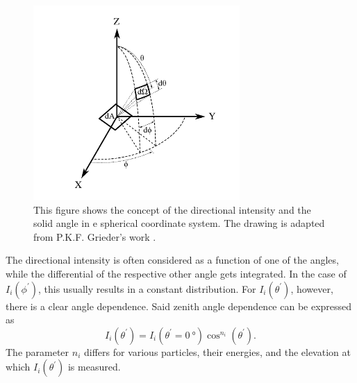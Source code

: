 \begin{figure}[htbp]
    \centering
    \includegraphics[width=0.7\textwidth]{images/Theory/DirectionalIntensity.pdf}
    \caption[Concept of Directional Intensity and Solid Ange]{This figure shows the concept of the directional intensity and the solid angle in e spherical coordinate system. The drawing is adapted from P.K.F. Grieder's work \cite{CosmicRayGrieder}.}
    \label{fig:DirectionalIntensityConcept}
\end{figure}
The directional intensity is often considered as a function of one of the angles, while the differential of the respective other angle gets integrated. In the case of $I_i(\phi^\prime)$, this usually results in a constant distribution. For $I_i(\theta^\prime)$, however, there is a clear angle dependence. Said zenith angle dependence can be expressed as 
\begin{equation}\label{eq:ThetaDependentIntensity}
    I_i(\theta^\prime) = I_i(\theta^\prime=\SI{0}{\degree}) \cos^{n_{i}}{(\theta^\prime)}.
\end{equation}
The parameter $n_{i}$ differs for various particles, their energies, and the elevation at which $I_i(\theta^\prime)$ is measured.

